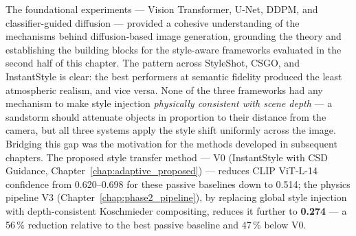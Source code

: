 \noindent The foundational experiments --- Vision Transformer, U-Net, DDPM, and classifier-guided diffusion --- provided a cohesive understanding of the mechanisms behind diffusion-based image generation, grounding the theory and establishing the building blocks for the style-aware frameworks evaluated in the second half of this chapter.
The pattern across StyleShot, CSGO, and InstantStyle is clear: the best performers at semantic fidelity produced the least atmospheric realism, and vice versa.
None of the three frameworks had any mechanism to make style injection \emph{physically consistent with scene depth} --- a sandstorm should attenuate objects in proportion to their distance from the camera, but all three systems apply the style shift uniformly across the image.
Bridging this gap was the motivation for the methods developed in subsequent chapters.
The proposed style transfer method --- V0 (InstantStyle with CSD Guidance, Chapter~\ref{chap:adaptive_proposed}) --- reduces CLIP ViT-L-14 confidence from 0.620--0.698 for these passive baselines down to 0.514; the physics pipeline V3 (Chapter~\ref{chap:phase2_pipeline}), by replacing global style injection with depth-consistent Koschmieder compositing, reduces it further to \textbf{0.274} --- a 56\,\% reduction relative to the best passive baseline and 47\,\% below V0.
